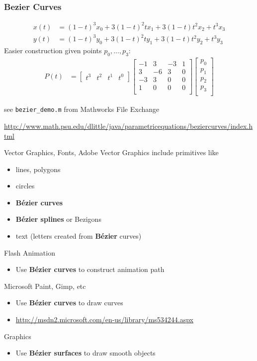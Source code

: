 \documentclass[10pt]{beamer}
\begin{document}
\begin{frame}
\frametitle{Bezier Curves}
\begin{align*}
  x(t) & = (1-t)^3 x_0 + 3(1-t)^2 t x_1 + 3(1-t)t^2 x_2 + t^3 x_3\\
  y(t) & = (1-t)^3 y_0 + 3(1-t)^2 t y_1 + 3(1-t)t^2 y_2 + t^3 y_3
\end{align*}
Easier construction given points $p_0, \dots,p_3$:
\begin{align*}
  P(t) & = \begin{bmatrix}t^3&t^2&t^1&t^0\end{bmatrix}
           \begin{bmatrix}
           -1 &  3 & -3 & 1\\
            3 & -6 &  3 & 0\\
           -3 &  3 &  0 & 0\\
            1 &  0 &  0 & 0\\
           \end{bmatrix}
            \begin{bmatrix}p_0\\p_1\\p_2\\p_3\\\end{bmatrix}
\end{align*}
\begin{block}{}
see \texttt{bezier\_demo.m} from Mathworks File Exchange

\url{http://www.math.psu.edu/dlittle/java/parametricequations/beziercurves/index.html}
\end{block}
\end{frame}
\begin{frame}{Vector Graphics, Fonts, Adobe}
  Vector Graphics include primitives like
\begin{itemize}
  \item lines, polygons
  \item circles\
  \item { {\bf B\'ezier curves} }
  \item { {\bf B\'ezier splines} } or Bezigons
  \item text (letters created from {\bf B\'ezier} curves)
\end{itemize}

Flash Animation
\begin{itemize}
  \item Use {\bf B\'ezier curves} to construct animation path
\end{itemize}

Microsoft Paint, Gimp, etc
\begin{itemize}
  \item Use {\bf B\'ezier curves} to draw curves
  \item \url{http://msdn2.microsoft.com/en-us/library/ms534244.aspx}
\end{itemize}

Graphics
\begin{itemize}
  \item Use {\bf B\'ezier surfaces} to draw smooth objects
\end{itemize}
\end{frame}
\end{document}
